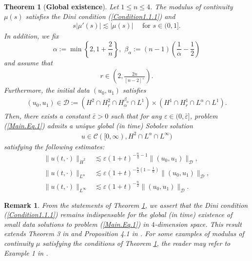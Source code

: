 \documentclass[11pt,reqno]{amsart}
\newtheorem{theorem}{Theorem}[section]
\newtheorem{remark}{Remark}[section]
\begin{document}
\begin{theorem}[\textbf{Global existence}]\label{Theorem1}
     Let $1 \leq n \leq 4$. The modulus of continuity $\mu(s) $ satisfies the Dini condition (\ref{Condition1.1.1})
     and
     \begin{align}\label{Condition1.1.2}
         s|\mu'(s)| \lesssim |\mu(s)|  \quad \text{ for } s \in (0, 1].
     \end{align}
    In addition, we fix $$\alpha := \min\left\{2, 1+\frac{2}{n}\right\}, \,\,\beta_\alpha := (n-1)\left(\frac{1}{\alpha}-\frac{1}{2}\right)$$ and assume that
    \begin{align*}
        r \in \left(2, \frac{2n}{[n-2]^+}\right).
    \end{align*}
    Furthermore, the initial data $(u_0, u_1)$ satisfies
    \begin{align*}
        (u_0, u_1) \in \mathcal{D} := \left(H^2 \cap H^{2}_r \cap H^{\beta_\alpha}_\alpha\cap L^1  \right)\times \left(H^1 \cap H^1_r \cap L^{\alpha} \cap L^1\right).
    \end{align*}
    Then, there exists a constant $\bar{\varepsilon} > 0$ such that for any $\varepsilon \in (0, \bar{\varepsilon}]$, problem (\ref{Main.Eq.1}) admits a unique global (in time) Sobolev solution
    \begin{align*}
        u \in \mathcal{C}([0, \infty), H^2 \cap L^\alpha \cap L^\infty)
    \end{align*}
    satisfying the following estimates:
    \begin{align*}
        \|u(t,\cdot)\|_{\dot{H}^2} &\lesssim \varepsilon(1+t)^{-\frac{n}{4}-1} \|(u_0,u_1)\|_{\mathcal{D}},\\
        \|u(t,\cdot)\|_{L^{\alpha}} &\lesssim \varepsilon(1+t)^{-\frac{n}{2}(1-\frac{1}{\alpha})} \|(u_0,u_1)\|_{\mathcal{D}},\\
        \|u(t,\cdot)\|_{L^\infty} &\lesssim \varepsilon(1+t)^{-\frac{n}{2}}  \|(u_0,u_1)\|_{\mathcal{D}}.
    \end{align*}
\end{theorem}

\begin{remark}
\selectfont
    From the statements of Theorem \ref{Theorem1}, we assert that the Dini condition (\ref{Condition1.1.1}) remains indispensable for the global (in time) existence of small data solutions to problem (\ref{Main.Eq.1}) in $4$-dimension space. This result extends Theorem 3 in \cite{EbeGirRei2020} and Proposition 4.1  in \cite{Girardi2024}.  For some examples of modulus of continuity $\mu$ satisfying the conditions of Theorem \ref{Theorem1}, the reader may refer to Example 1 in \cite{EbeGirRei2020}. 
\end{remark}
\end{document}
